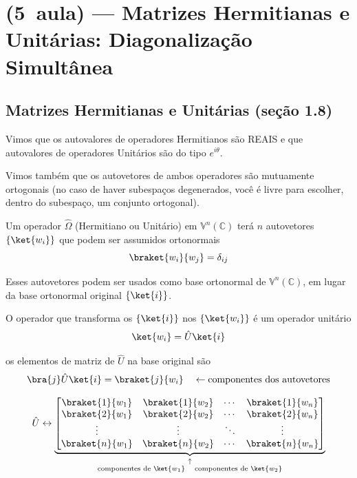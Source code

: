 \section*{(5\textordfeminine\ aula) --- Matrizes Hermitianas e Unitárias: Diagonalização Simultânea}

\subsection*{Matrizes Hermitianas e Unitárias (seção 1.8)}

Vimos que os autovalores de operadores Hermitianos são REAIS e que autovalores de operadores Unitários são do tipo $e^{i\theta}$.

Vimos também que os autovetores de ambos operadores são mutuamente ortogonais (no caso de haver subespaços degenerados, você é livre para escolher, dentro do subespaço, um conjunto ortogonal).

Um operador $\hat{\Omega}$ (Hermitiano ou Unitário) em $\mathbb{V}^n(\mathbb{C})$ terá $n$ autovetores $\{\ket{w_i}\}$ que podem ser assumidos ortonormais
\begin{equation}
    \braket{w_i}{w_j} = \delta_{ij}
\end{equation}

Esses autovetores podem ser usados como base ortonormal de $\mathbb{V}^n(\mathbb{C})$, em lugar da base ortonormal original $\{\ket{i}\}$.

O operador que transforma os $\{\ket{i}\}$ nos $\{\ket{w_i}\}$ é um operador unitário
\begin{equation}
    \ket{w_i} = \hat{U}\ket{i}
\end{equation}


os elementos de matriz de $\hat{U}$ na base original são
\begin{equation}
    \bra{j}\hat{U}\ket{i} = \braket{j}{w_i} \quad \leftarrow \text{componentes dos autovetores}
\end{equation}

\[
\hat{U} \leftrightarrow
\underbrace{
\begin{bmatrix}
\braket{1}{w_1} & \braket{1}{w_2} & \cdots & \braket{1}{w_n} \\
\braket{2}{w_1} & \braket{2}{w_2} & \cdots & \braket{2}{w_n} \\
\vdots & \vdots & \ddots & \vdots \\
\braket{n}{w_1} & \braket{n}{w_2} & \cdots & \braket{n}{w_n}
\end{bmatrix}
}_{\substack{\uparrow \\ \text{componentes de } \ket{w_1} \quad \text{componentes de } \ket{w_2}}}
\]

